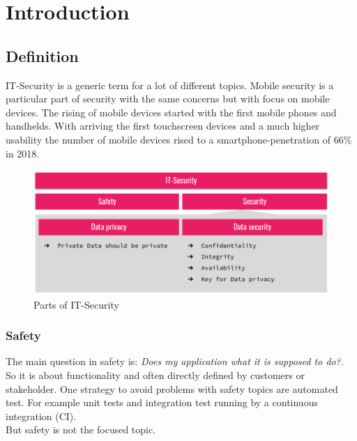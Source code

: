 \chapter{Introduction}
\label{chp:intro}



\section{Definition}
\label{chp:intro:sec:definition}

IT-Security is a generic term for a lot of different topics. Mobile security is a particular part of security with the same concerns but with focus on mobile devices. The rising of mobile devices started with the first mobile phones and handhelds. With arriving the first touchscreen devices and a much higher usability the number of mobile devices rised to a smartphone-penetration of 66\% in 2018. \cite{smartphone-penetration}

\begin{figure}[h]
	\includegraphics[width=\textwidth, angle=0]{img/it_security.pdf}
		\caption{Parts of IT-Security}
	\label{img:part_it_security}
\end{figure}

\subsection{Safety}
\label{chp:intro:sec:definition:ssec:safety}

The main question in safety is: \textit{Does my application what it is supposed to do?}. \\
So it is about functionality and often directly defined by customers or stakeholder. One strategy to avoid problems with safety topics are automated test. For example unit tests and integration test running by a continuous integration (CI). \\
But safety is not the focused topic.

